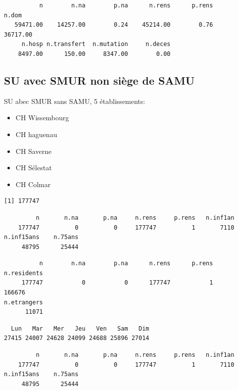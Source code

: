 \documentclass[]{article}
\begin{document}
\begin{verbatim}
          n        n.na        p.na      n.rens      p.rens       n.dom 
   59471.00    14257.00        0.24    45214.00        0.76    36717.00 
     n.hosp n.transfert  n.mutation     n.deces 
    8497.00      150.00     8347.00        0.00 
\end{verbatim}

\subsection{SU avec SMUR non siège de
SAMU}\label{su-avec-smur-non-siege-de-samu}

SU abec SMUR sans SAMU, 5 établissements:

\begin{itemize}
\itemsep1pt\parskip0pt
\item
  CH Wissembourg
\item
  CH haguenau
\item
  CH Saverne
\item
  CH Sélestat
\item
  CH Colmar
\end{itemize}

\begin{verbatim}
[1] 177747
\end{verbatim}

\begin{verbatim}
         n       n.na       p.na     n.rens     p.rens   n.inf1an 
    177747          0          0     177747          1       7110 
n.inf15ans    n.75ans 
     48795      25444 
\end{verbatim}

\begin{verbatim}
          n        n.na        p.na      n.rens      p.rens n.residents 
     177747           0           0      177747           1      166676 
n.etrangers 
      11071 
\end{verbatim}

\begin{verbatim}
  Lun   Mar   Mer   Jeu   Ven   Sam   Dim 
27415 24007 24628 24099 24688 25896 27014 
\end{verbatim}

\begin{verbatim}
         n       n.na       p.na     n.rens     p.rens   n.inf1an 
    177747          0          0     177747          1       7110 
n.inf15ans    n.75ans 
     48795      25444 
\end{verbatim}
\end{document}
